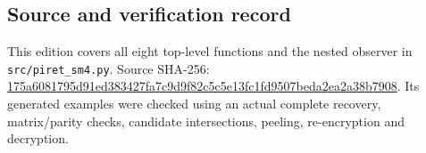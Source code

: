 \subsection{Source and verification record}
This edition covers all eight top-level functions and the nested observer in \texttt{src/piret\_sm4.py}. Source SHA-256: \url{175a6081795d91ed383427fa7c9d9f82c5c5e13fc1fd9507beda2ea2a38b7908}.
Its generated examples were checked using an actual complete recovery, matrix/parity checks, candidate intersections, peeling, re-encryption and decryption.
